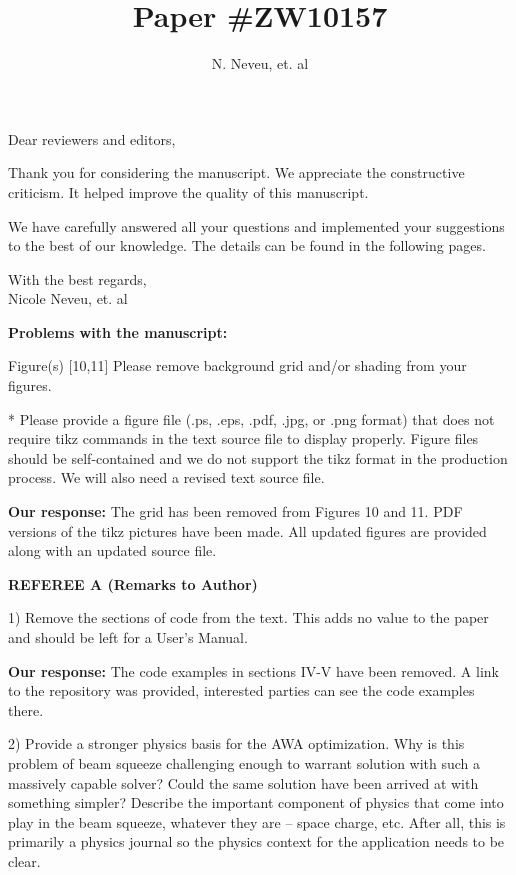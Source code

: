 \documentclass{article}
\begin{document}
\title {Paper  \#ZW10157}
\author {N. Neveu, et. al}

\maketitle
Dear reviewers and editors,

Thank you for considering the manuscript.
We appreciate the constructive criticism. 
It helped improve the quality of this manuscript.

We have carefully answered all your questions and implemented your suggestions to the best of our knowledge.
The details can be found in the following pages.

With the best regards,  \\[3mm]
 
Nicole Neveu, et. al

\pagebreak

{\bf Problems with the manuscript:}

{ Figure(s) [10,11] 
	Please remove background grid and/or shading from your figures.

* Please provide a figure file (.ps, .eps, .pdf, .jpg, or .png format)
that does not require tikz commands in the text source file to
display properly. Figure files should be self-contained and we do
not support the tikz format in the production process. We will also
need a revised text source file.}

{\bf Our response:} {\color{blue} The grid has been removed from Figures 10 and 11.
PDF versions of the tikz pictures have been made. All updated figures are provided 
along with an updated source file.}


{\bf REFEREE A (Remarks to Author)}

1) Remove the sections of code from the text. This adds no value to
	the paper and should be left for a User’s Manual.

{\bf Our response:} {\color{blue} The code examples in sections IV-V have been removed.
A link to the repository was provided, interested parties can see the code examples there.}


2) Provide a stronger physics basis for the AWA optimization. Why is
this problem of beam squeeze challenging enough to warrant solution
with such a massively capable solver? Could the same solution have
been arrived at with something simpler? Describe the important
component of physics that come into play in the beam squeeze, whatever
they are – space charge, etc. After all, this is primarily a physics
journal so the physics context for the application needs to be clear.
\end{document}
